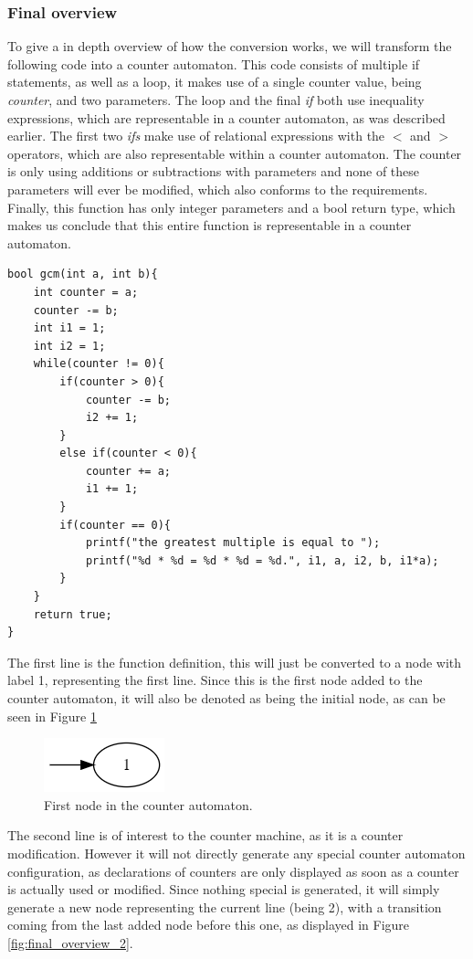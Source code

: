 \documentclass[12pt]{article}
\begin{document}
\subsubsection{Final overview}
To give a in depth overview of how the conversion works, we will transform the following code into a counter automaton. This code consists of multiple if statements, as well as a loop, it makes use of a single counter value, being \textit{counter}, and two parameters. The loop and the final \textit{if} both use inequality expressions, which are representable in a counter automaton, as was described earlier. The first two \textit{ifs} make use of relational expressions with the $<$ and $>$ operators, which are also representable within a counter automaton. The counter is only  using additions or subtractions with parameters and none of these parameters will ever be modified, which also conforms to the requirements. Finally, this function has only integer parameters and a bool return type, which makes us conclude that this entire function is representable in a counter automaton.

\begin{lstlisting}[style=CStyle]
bool gcm(int a, int b){
	int counter = a;
	counter -= b;
	int i1 = 1;
	int i2 = 1;
	while(counter != 0){
		if(counter > 0){
			counter -= b;
			i2 += 1;
		}
		else if(counter < 0){
			counter += a;
			i1 += 1;
		}
		if(counter == 0){
			printf("the greatest multiple is equal to ");
			printf("%d * %d = %d * %d = %d.", i1, a, i2, b, i1*a);
		}
	}
	return true;
}
\end{lstlisting}

The first line is the function definition, this will just be converted to a node with label 1, representing the first line. Since this is the first node added to the counter automaton, it will also be denoted as being the initial node, as can be seen in Figure \ref{fig:final_overview_1}

\begin{figure}[h]
	\centering
	\includegraphics[width=0.2\linewidth]{final_overview_1}
	\caption{First node in the counter automaton.}
	\label{fig:final_overview_1}
\end{figure}

The second line is of interest to the counter machine, as it is a counter modification. However it will not directly generate any special counter automaton configuration, as declarations of counters are only displayed as soon as a counter is actually used or modified. Since nothing special is generated, it will simply generate a new node representing the current line (being 2), with a transition coming from the last added node before this one, as displayed in Figure \ref{fig:final_overview_2}.
\end{document}
